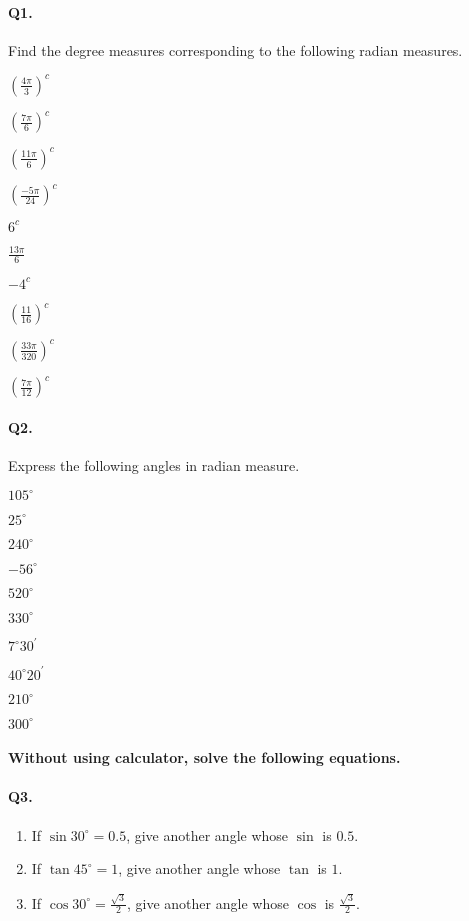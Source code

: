 \documentclass{article}
\begin{document}
\paragraph{Q1.}
Find the degree measures corresponding to the following radian measures.

\begin{enumerate*}[label=\alph*.]
  \item $\left(\frac{4\pi}{3}\right)^{c}$
  \item $\left(\frac{7\pi}{6}\right)^{c}$
  \item $\left(\frac{11\pi}{6}\right)^{c}$
  \item $\left(\frac{-5\pi}{24}\right)^{c}$
  \item $6^{c}$
  \item $\frac{13\pi}{6}$
  \item $-4^{c}$
  \item $\left(\frac{11}{16}\right)^{c}$
  \item $\left(\frac{33\pi}{320}\right)^{c}$
  \item $\left(\frac{7\pi}{12}\right)^{c}$
\end{enumerate*}

\paragraph{Q2.}
Express the following angles in radian measure.

\begin{enumerate*}[label=\alph*)]
  \item $105^{\circ}$
  \item $25^{\circ}$
  \item $240^{\circ}$
  \item $-56^{\circ}$
  \item $520^{\circ}$
  \item $330^{\circ}$
  \item $7^{\circ}30^{'}$
  \item $40^{\circ}20^{'}$
  \item $210^{\circ}$
  \item $300^{\circ}$
\end{enumerate*}

\paragraph{Without using calculator, solve the following equations.}
\paragraph{Q3.}
\begin{enumerate}[label=\alph*)]
  \item If $\sin30^{\circ} = 0.5$, give another angle whose $\sin$ is $0.5$.
  \item If $\tan45^{\circ} = 1$, give another angle whose $\tan$ is $1$.
  \item If $\cos30^{\circ} = \frac{\sqrt{3}}{2}$, give another angle whose $\cos$ is $\frac{\sqrt{3}}{2}$.
\end{enumerate}
\end{document}
